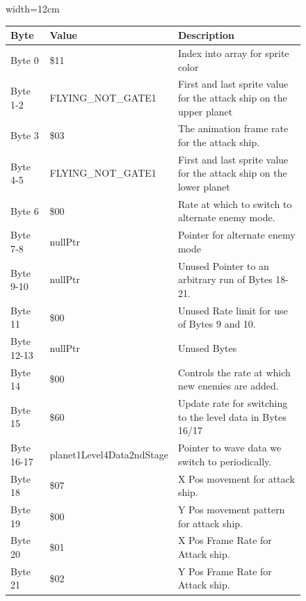\begin{figure}[H]
{\begin{adjustbox}{width=12cm}
\begin{tabular}{lll}
\toprule
 Byte       & Value                     & Description                                                         \\
\midrule
 Byte 0     & \$11                       & Index into array for sprite color                                   \\
 Byte 1-2   & FLYING\_NOT\_GATE1          & First and last sprite value for the attack ship on the upper planet \\
 Byte 3     & \$03                       & The animation frame rate for the attack ship.                       \\
 Byte 4-5   & FLYING\_NOT\_GATE1          & First and last sprite value for the attack ship on the lower planet \\
 Byte 6     & \$00                       & Rate at which to switch to alternate enemy mode.                    \\
 Byte 7-8   & nullPtr                   & Pointer for alternate enemy mode                                    \\
 Byte 9-10  & nullPtr                   & Unused Pointer to an arbitrary run of Bytes 18-21.                  \\
 Byte 11    & \$00                       & Unused Rate limit for use of Bytes 9 and 10.                        \\
 Byte 12-13 & nullPtr                   & Unused Bytes                                                        \\
 Byte 14    & \$00                       & Controls the rate at which new enemies are added.                   \\
 Byte 15    & \$60                       & Update rate for switching to the level data in Bytes 16/17          \\
 Byte 16-17 & planet1Level4Data2ndStage & Pointer to wave data we switch to periodically.                     \\
 Byte 18    & \$07                       & X Pos movement for attack ship.                                     \\
 Byte 19    & \$00                       & Y Pos movement pattern for attack ship.                             \\
 Byte 20    & \$01                       & X Pos Frame Rate for Attack ship.                                   \\
 Byte 21    & \$02                       & Y Pos Frame Rate for Attack ship.                                   \\

\end{tabular}
\end{adjustbox}}
\end{figure}
